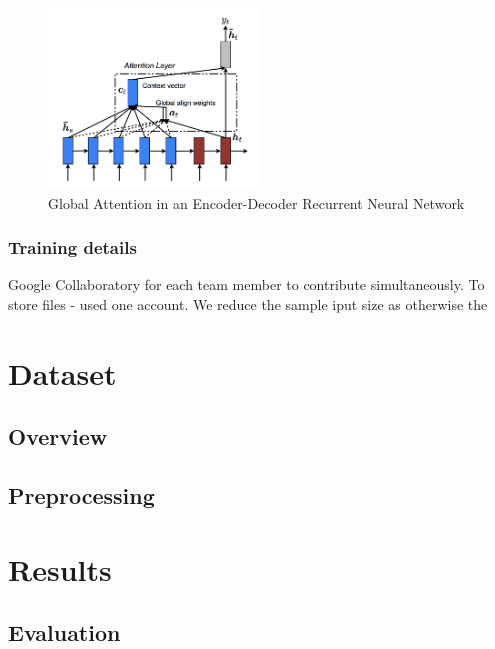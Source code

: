 \begin{figure}[h]
\centering
	\includegraphics[width=0.5\textwidth]{img/seq2seq-with-attention.png}
	\caption{\label{fig:attention}Global Attention in an Encoder-Decoder Recurrent Neural Network}
\end{figure}


\subsubsection{Training details}

Google Collaboratory for each team member to contribute simultaneously.
To store files - used one account.
We reduce the sample iput size as otherwise the 


\section{Dataset}
\subsection{Overview}

\subsection{Preprocessing}

\section{Results}
\subsection{Evaluation}

